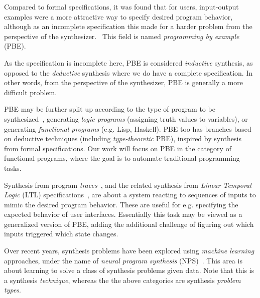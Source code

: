 \documentclass{article}
\begin{document}
Compared to formal specifications, it was found that for users,
input-output examples were a more attractive way to specify desired program behavior,
although as an incomplete specification this made for a harder problem from the perspective of the synthesizer.~\citep{bodik2013algorithmic}
This field is named \emph{programming by example} (PBE).

As the specification is incomplete here, PBE is considered \emph{inductive} synthesis, as opposed to the \emph{deductive} synthesis where we do have a complete specification.
In other words, from the perspective of the synthesizer, PBE is generally a more difficult problem.

PBE may be further split up according to the type of program to be synthesized~\citep{bodik2013algorithmic},
generating \emph{logic programs} (assigning truth values to variables),
or generating \emph{functional programs} (e.g. Lisp, Haskell).
PBE too has branches based on deductive techniques (including \emph{type-theoretic} PBE),
inspired by synthesis from formal specifications.
Our work will focus on PBE in the category of functional programs,
where the goal is to automate traditional programming tasks.


Synthesis from program \emph{traces}~\citep{koskimies1994automatic},
and the related synthesis from \emph{Linear Temporal Logic} (LTL)
specifications~\citep{camacho2019towards}, are about
a system reacting to sequences of inputs to mimic the desired program behavior.
These are useful for e.g. specifying the expected behavior of user interfaces.
Essentially this task may be viewed as a generalized version of PBE,
adding the additional challenge of figuring out which inputs triggered which state changes.


Over recent years, synthesis problems have been explored using \emph{machine learning} approaches,
under the name of \emph{neural program synthesis} (NPS)~\citep{nps}.
This area is about learning to solve a class of synthesis problems given data.
Note that this is a synthesis \emph{technique}, whereas the the above categories are synthesis \emph{problem types}.
\end{document}
